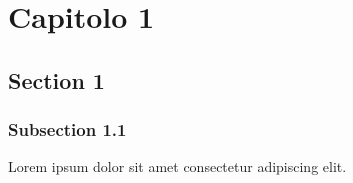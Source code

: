\chapter{Capitolo 1}

\section{Section 1}
\subsection{Subsection 1.1}
Lorem ipsum dolor sit amet consectetur adipiscing elit.

